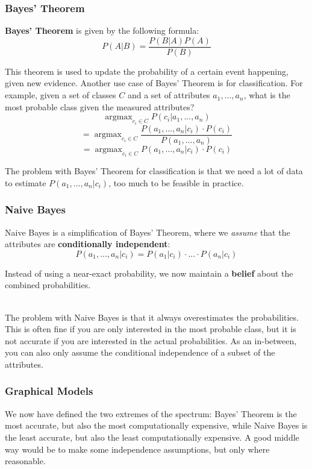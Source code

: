 \documentclass[12pt]{article}
\DeclareMathOperator*{\argmax}{argmax}
\begin{document}
\subsubsection{Bayes' Theorem}
\textbf{Bayes' Theorem} is given by the following formula:
\[ P(A | B) = \frac{P(B | A) P(A)}{P(B)} \]

\noindent
This theorem is used to update the probability of a certain event happening, given new evidence.
Another use case of Bayes' Theorem is for classification.
For example, given a set of classes $C$ and a set of attributes $a_1, ... , a_n$, what is the most probable class given the measured attributes?
\[ \argmax_{c_i \in C} P(c_i | a_1, ... , a_n) \]
\[ = \argmax_{c_i \in C} \frac{P(a_1, ... , a_n | c_i) \cdot P(c_i)}{P(a_1, ... , a_n)} \]
\[ = \argmax_{c_i \in C} P(a_1, ... , a_n | c_i) \cdot P(c_i) \]

\noindent
The problem with Bayes' Theorem for classification is that we need a lot of data to estimate $P(a_1, ... , a_n | c_i)$, too much to be feasible in practice.

\subsubsection{Naive Bayes}
Naive Bayes is a simplification of Bayes' Theorem, where we \textit{assume} that the attributes are \textbf{conditionally independent}:
\[ P(a_1, ... , a_n | c_i) = P(a_1 | c_i) \cdot ... \cdot P(a_n | c_i) \]

\newpage
\noindent
Instead of using a near-exact probability, we now maintain a \textbf{belief} about the combined probabilities.

\noindent
\\
The problem with Naive Bayes is that it always overestimates the probabilities.
This is often fine if you are only interested in the most probable class, but it is not accurate if you are interested in the actual probabilities.
As an in-between, you can also only assume the conditional independence of a subset of the attributes.

\subsubsection{Graphical Models}
We now have defined the two extremes of the spectrum: Bayes' Theorem is the most accurate, but also the most computationally expensive, while Naive Bayes is the least accurate, but also the least computationally expensive.
A good middle way would be to make some independence assumptions, but only where reasonable.
\end{document}
